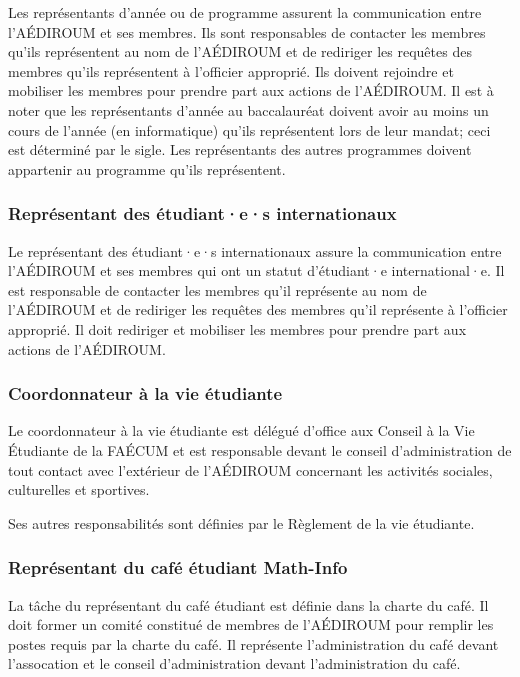 \documentclass{aediroum}
\begin{document}
Les représentants d'année ou de programme assurent la communication entre l'AÉDIROUM et ses membres. Ils sont responsables de contacter les membres qu'ils représentent au nom de l'AÉDIROUM et de rediriger les requêtes des membres qu'ils représentent à l'officier approprié. Ils doivent rejoindre et mobiliser les membres pour prendre part aux actions de l'AÉDIROUM. Il est à noter que les représentants d'année au baccalauréat doivent avoir au moins un cours de l'année (en informatique) qu'ils représentent lors de leur mandat; ceci est déterminé par le sigle. Les représentants des autres programmes doivent appartenir au programme qu'ils représentent.

\subsubsection{Représentant des étudiant·e·s internationaux}\label{sec:representant-des-etudiants-internationaux}

Le représentant des étudiant·e·s internationaux assure la communication entre l'AÉDIROUM et ses membres qui ont un statut d'étudiant·e international·e. Il est responsable de contacter les membres qu'il représente au nom de l'AÉDIROUM et de rediriger les requêtes des membres qu'il représente à l'officier approprié. Il doit rediriger et mobiliser les membres pour prendre part aux actions de l'AÉDIROUM.

\subsubsection{Coordonnateur à la vie étudiante}\label{sec:coordonnateur-a-la-vie-etudiante}

Le coordonnateur à la vie étudiante est délégué d'office aux Conseil à la Vie Étudiante de la FAÉCUM et est responsable devant le conseil d'administration de tout contact avec l'extérieur de l'AÉDIROUM concernant les activités sociales, culturelles et sportives.

Ses autres responsabilités sont définies par le Règlement de la vie étudiante.

\subsubsection{Représentant du café étudiant Math-Info}\label{sec:representant-du-cafe-etudiant-math-info}

La tâche du représentant du café étudiant est définie dans la charte du café. Il doit former un comité constitué de membres de l'AÉDIROUM pour remplir les postes requis par la charte du café. Il représente l'administration du café devant l'assocation et le conseil d'administration devant l'administration du café.
\end{document}
